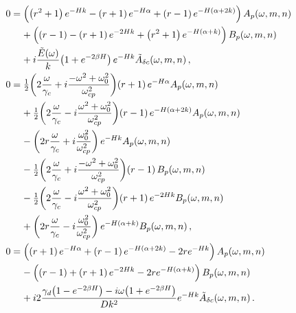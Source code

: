 \documentclass[reqno]{amsart}
\numberwithin{equation}{section}
\numberwithin{figure}{section}
\begin{document}
\begin{align}
0
  &= \left(\left(r^{2}+1\right)e^{-\aHeight k}-\left(r+1\right)e^{-\aHeight\alpha}+\left(r-1\right)e^{-\aHeight\left(\alpha+2k\right)}\right)A_{p}\!\left(\omega,m,n\right) \nonumber \\
  &\phantom{=}\,\,+\left(\left(r-1\right)-\left(r+1\right)e^{-2\aHeight k}+\left(r^{2}+1\right)e^{-\aHeight\left(\alpha+k\right)}\right)B_{p}\!\left(\omega,m,n\right) \nonumber \\
  &\phantom{=}\,\,+i\frac{\tilde{E}\!\left(\omega\right)}{k}\!\left(1+e^{-2\beta \aHeight}\right)e^{-\aHeight k}\tilde{A}_{\delta\sBulkCo}\!\left(\omega,m,n\right), \label{eq:model-final-form} \\
0
  &= \tfrac{1}{2}\!\left(2\frac{\omega}{\gamma_{c}}+i\frac{-\omega^{2}+\omega_{0}^{2}}{\omega_{cp}^{2}}\right)\!\left(r+1\right)e^{-\aHeight\alpha}A_{p}\!\left(\omega,m,n\right) \nonumber \\
  &\phantom{=}\,\,+\tfrac{1}{2}\!\left(2\frac{\omega}{\gamma_{c}}-i\frac{\omega^{2}+\omega_{0}^{2}}{\omega_{cp}^{2}}\right)\!\left(r-1\right)e^{-\aHeight\left(\alpha+2k\right)}A_{p}\!\left(\omega,m,n\right) \nonumber \\
  &\phantom{=}\,\,-\left(2r\frac{\omega}{\gamma_{c}}+i\frac{\omega_{0}^{2}}{\omega_{cp}^{2}}\right)e^{-\aHeight k}A_{p}\!\left(\omega,m,n\right) \nonumber \\
  &\phantom{=}\,\,-\tfrac{1}{2}\!\left(2\frac{\omega}{\gamma_{c}}+i\frac{-\omega^{2}+\omega_{0}^{2}}{\omega_{cp}^{2}}\right)\!\left(r-1\right)B_{p}\!\left(\omega,m,n\right) \nonumber \\
  &\phantom{=}\,\,-\tfrac{1}{2}\!\left(2\frac{\omega}{\gamma_{c}}-i\frac{\omega^{2}+\omega_{0}^{2}}{\omega_{cp}^{2}}\right)\!\left(r+1\right)e^{-2\aHeight k}B_{p}\!\left(\omega,m,n\right) \nonumber \\
  &\phantom{=}\,\,+\left(2r\frac{\omega}{\gamma_{c}}-i\frac{\omega_{0}^{2}}{\omega_{cp}^{2}}\right)e^{-\aHeight\left(\alpha+k\right)}B_{p}\!\left(\omega,m,n\right), \nonumber \\
0
  &= \left(\left(r+1\right)e^{-\aHeight\alpha}+\left(r-1\right)e^{-\aHeight\left(\alpha+2k\right)}-2re^{-\aHeight k}\right)A_{p}\!\left(\omega,m,n\right) \nonumber \\
  &\phantom{=}\,\,-\left(\left(r-1\right)+\left(r+1\right)e^{-2\aHeight k}-2re^{-\aHeight\left(\alpha+k\right)}\right)B_{p}\!\left(\omega,m,n\right) \nonumber \\
  &\phantom{=}\,\,+i2\frac{\gamma_{d}\!\left(1-e^{-2\beta \aHeight}\right)-i\omega\!\left(1+e^{-2\beta \aHeight}\right)}{Dk^{2}}e^{-\aHeight k}\tilde{A}_{\delta\sBulkCo}\!\left(\omega,m,n\right). \nonumber
\end{align}
\end{document}
